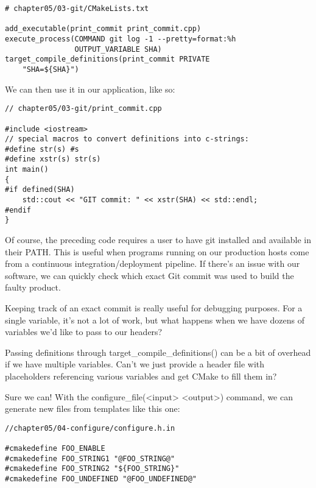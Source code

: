 \begin{lstlisting}[style=styleCMake]
# chapter05/03-git/CMakeLists.txt

add_executable(print_commit print_commit.cpp)
execute_process(COMMAND git log -1 --pretty=format:%h
				OUTPUT_VARIABLE SHA)
target_compile_definitions(print_commit PRIVATE
	"SHA=${SHA}")
\end{lstlisting}  

We can then use it in our application, like so:

\begin{lstlisting}[style=styleCXX]
// chapter05/03-git/print_commit.cpp
	
#include <iostream>
// special macros to convert definitions into c-strings:
#define str(s) #s
#define xstr(s) str(s)
int main()
{
#if defined(SHA)
	std::cout << "GIT commit: " << xstr(SHA) << std::endl;
#endif
}
\end{lstlisting}  

Of course, the preceding code requires a user to have git installed and available in their PATH. This is useful when programs running on our production hosts come from a continuous integration/deployment pipeline. If there's an issue with our software, we can quickly check which exact Git commit was used to build the faulty product.

Keeping track of an exact commit is really useful for debugging purposes. For a single variable, it's not a lot of work, but what happens when we have dozens of variables we'd like to pass to our headers?


Passing definitions through target\_compile\_definitions() can be a bit of overhead if we have multiple variables. Can't we just provide a header file with placeholders referencing various variables and get CMake to fill them in?

Sure we can! With the configure\_file(<input> <output>) command, we can generate new files from templates like this one:

\begin{lstlisting}[style=styleCXX]
//chapter05/04-configure/configure.h.in

#cmakedefine FOO_ENABLE
#cmakedefine FOO_STRING1 "@FOO_STRING@"
#cmakedefine FOO_STRING2 "${FOO_STRING}"
#cmakedefine FOO_UNDEFINED "@FOO_UNDEFINED@"
\end{lstlisting}  

